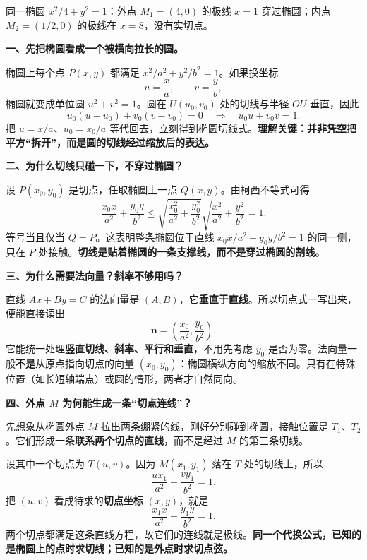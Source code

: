 \begin{explanationbox}
\begin{minipage}{\linewidth}
\begin{center}\end{center}
同一椭圆 $x^2/4+y^2=1$：外点 $M_1=(4,0)$ 的极线 $x=1$ 穿过椭圆；内点 $M_2=(1/2,0)$ 的极线在 $x=8$，没有实切点。
\end{minipage}
\par\medskip

\textbf{一、先把椭圆看成一个被横向拉长的圆。}

椭圆上每个点 $P(x,y)$ 都满足 $x^2/a^2+y^2/b^2=1$。如果换坐标
\[
 u=\frac{x}{a},\qquad v=\frac{y}{b},
\]
椭圆就变成单位圆 $u^2+v^2=1$。圆在 $U(u_0,v_0)$ 处的切线与半径 $OU$ 垂直，因此
\[
 u_0(u-u_0)+v_0(v-v_0)=0
 \quad\Longrightarrow\quad u_0u+v_0v=1.
\]
把 $u=x/a$、$u_0=x_0/a$ 等代回去，立刻得到椭圆切线式。\textbf{理解关键：并非凭空把平方“拆开”，而是圆的切线经过缩放后的表达。}

\medskip
\textbf{二、为什么切线只碰一下，不穿过椭圆？}

设 $P(x_0,y_0)$ 是切点，任取椭圆上一点 $Q(x,y)$。由柯西不等式可得
\[
 \frac{x_0x}{a^2}+\frac{y_0y}{b^2}
 \le\sqrt{\frac{x_0^2}{a^2}+\frac{y_0^2}{b^2}}
     \sqrt{\frac{x^2}{a^2}+\frac{y^2}{b^2}}=1.
\]
等号当且仅当 $Q=P$。这表明整条椭圆位于直线
$x_0x/a^2+y_0y/b^2=1$ 的同一侧，只在 $P$ 处接触。\textbf{切线是贴着椭圆的一条支撑线，而不是穿过椭圆的割线。}

\medskip
\textbf{三、为什么需要法向量？斜率不够用吗？}

直线 $Ax+By=C$ 的法向量是 $(A,B)$，它\textbf{垂直于直线}。所以切点式一写出来，便能直接读出
\[
 \boldsymbol n=\left(\frac{x_0}{a^2},\frac{y_0}{b^2}\right).
\]
它能统一处理\textbf{竖直切线、斜率、平行和垂直}，不用先考虑 $y_0$ 是否为零。法向量一般\textbf{不是}从原点指向切点的向量 $(x_0,y_0)$：椭圆横纵方向的缩放不同。只有在特殊位置（如长短轴端点）或圆的情形，两者才自然同向。

\medskip
\textbf{四、外点 $M$ 为何能生成一条“切点连线”？}

先想象从椭圆外点 $M$ 拉出两条绷紧的线，刚好分别碰到椭圆，接触位置是 $T_1$、$T_2$。它们形成一条\textbf{联系两个切点的直线}，而不是经过 $M$ 的第三条切线。

设其中一个切点为 $T(u,v)$。因为 $M(x_1,y_1)$ 落在 $T$ 处的切线上，所以
\[
 \frac{ux_1}{a^2}+\frac{vy_1}{b^2}=1.
\]
把 $(u,v)$ 看成待求的\textbf{切点坐标} $(x,y)$，就是
\[
 \frac{x_1x}{a^2}+\frac{y_1y}{b^2}=1.
\]
两个切点都满足这条直线方程，故它们的连线就是极线。\textbf{同一个代换公式，已知的是椭圆上的点时求切线；已知的是外点时求切点弦。}


\end{explanationbox}
